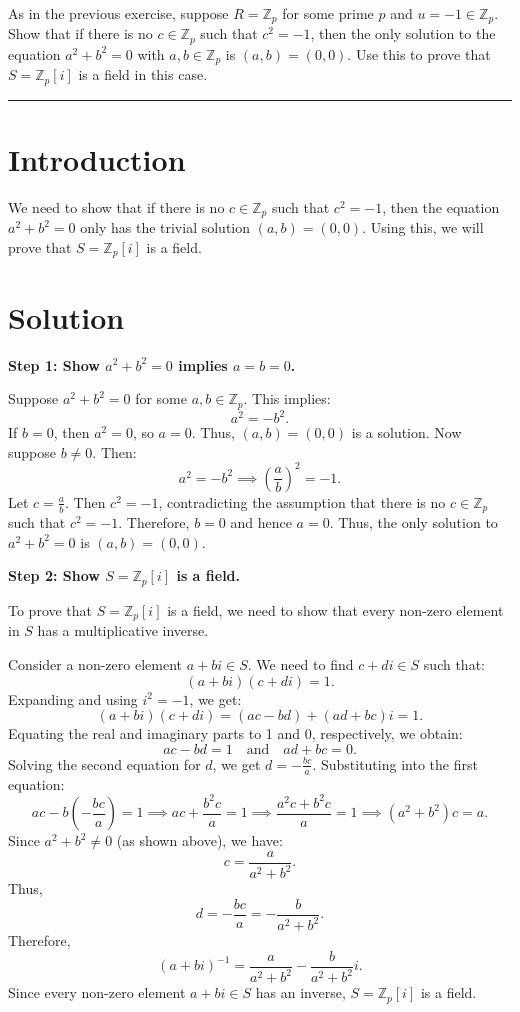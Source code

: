 \documentclass[12pt]{amsart}
\theoremstyle{definition}
\numberwithin{equation}{section}
\newcommand{\Z}{\mathbb{Z}}
\begin{document}
\newpage
\begin{exercise}{4} As in the previous exercise, suppose \(R=\Z_p\) for some prime \(p\) and \(u=-1\in \Z_p\). Show that if there is no \(c\in \Z_p\) such that \(c^2=-1\), then the only solution to the equation \(a^2+b^2=0\) with \(a,b\in \Z_p\) is \((a,b)=(0,0)\). Use this to prove that \(S = \Z_p[i]\) is a field in this case.

    \noindent\rule{\linewidth}{1pt}

    \section*{Introduction}
    We need to show that if there is no \(c \in \Z_p\) such that \(c^2 = -1\), then the equation \(a^2 + b^2 = 0\) only has the trivial solution \((a, b) = (0, 0)\). Using this, we will prove that \(S = \Z_p[i]\) is a field.

    \section*{Solution}
    \noindent \textbf{Step 1: Show \(a^2 + b^2 = 0\) implies \(a = b = 0\).}

    Suppose \(a^2 + b^2 = 0\) for some \(a, b \in \Z_p\). This implies:
    \[
    a^2 = -b^2.
    \]
    If \(b = 0\), then \(a^2 = 0\), so \(a = 0\). Thus, \((a, b) = (0, 0)\) is a solution. Now suppose \(b \neq 0\). Then:
    \[
    a^2 = -b^2 \implies {\left(\frac{a}{b}\right)}^2 = -1.
    \]
    Let \(c = \frac{a}{b}\). Then \(c^2 = -1\), contradicting the assumption that there is no \(c \in \Z_p\) such that \(c^2 = -1\). Therefore, \(b = 0\) and hence \(a = 0\). Thus, the only solution to \(a^2 + b^2 = 0\) is \((a, b) = (0, 0)\).

    \noindent \textbf{Step 2: Show \(S = \Z_p[i]\) is a field.}

    To prove that \(S = \Z_p[i]\) is a field, we need to show that every non-zero element in \(S\) has a multiplicative inverse.

    Consider a non-zero element \(a + bi \in S\). We need to find \(c + di \in S\) such that:
    \[
    (a + bi)(c + di) = 1.
    \]
    Expanding and using \(i^2 = -1\), we get:
    \[
    (a + bi)(c + di) = (ac - bd) + (ad + bc)i = 1.
    \]
    Equating the real and imaginary parts to 1 and 0, respectively, we obtain:
    \[
    ac - bd = 1 \quad \text{and} \quad ad + bc = 0.
    \]
    Solving the second equation for \(d\), we get \(d = -\frac{bc}{a}\). Substituting into the first equation:
    \[
    ac - b\left(-\frac{bc}{a}\right) = 1 \implies ac + \frac{b^2c}{a} = 1 \implies \frac{a^2c + b^2c}{a} = 1 \implies (a^2 + b^2)c = a.
    \]
    Since \(a^2 + b^2 \neq 0\) (as shown above), we have:
    \[
    c = \frac{a}{a^2 + b^2}.
    \]
    Thus,
    \[
    d = -\frac{bc}{a} = -\frac{b}{a^2 + b^2}.
    \]
    Therefore,
    \[
    {(a + bi)}^{-1} = \frac{a}{a^2 + b^2} - \frac{b}{a^2 + b^2}i.
    \]
    Since every non-zero element \(a + bi \in S\) has an inverse, \(S = \Z_p[i]\) is a field.


\end{exercise}
\end{document}
